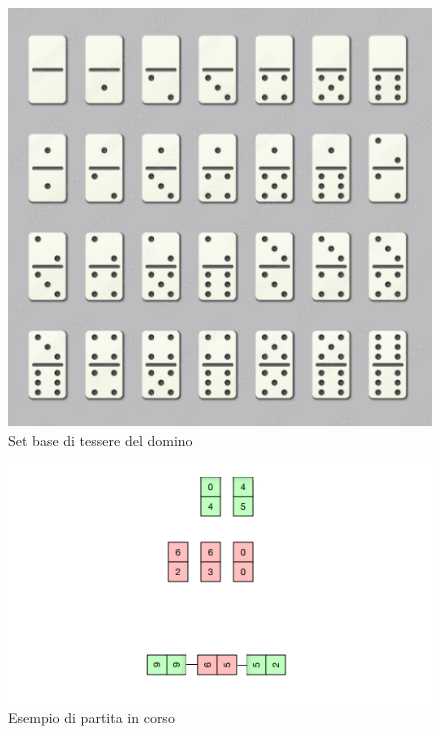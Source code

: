 \documentclass[a4paper,12pt]{report}
\begin{document}
\begin{figure}[h!]
    \centering
    \includegraphics[width=1\textwidth]{imgs/domino_set.png} 
    \caption{Set base di tessere del domino}
    \label{fig:domino_set}
\end{figure}

\begin{figure}[h!]
    \centering
    \includegraphics[width=1\textwidth]{imgs/domino_table.png} 
    \caption{Esempio di partita in corso}
    \label{fig:game_example}
\end{figure}

\vspace{0.5cm}
\end{document}
